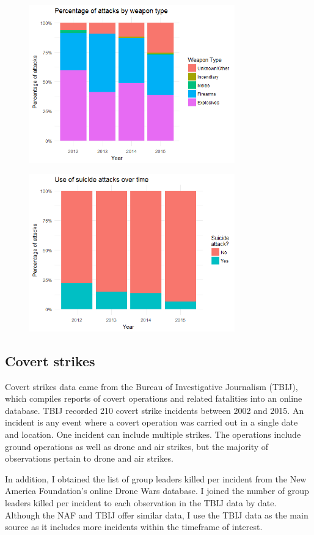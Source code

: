 \documentclass[letterpaper,12pt]{article}
\theoremstyle{definition}
\begin{document}
\begin{figure}[htb!]
  \includegraphics[width=3.5in]{attack_weapon.png}
\end{figure}

\begin{figure}[htb!]
  \includegraphics[width=3.5in]{attack_suicide.png}
\end{figure}

\subsection{Covert strikes}

Covert strikes data came from the Bureau of Investigative Journalism (TBIJ), which compiles reports of covert operations and related fatalities into an online database. TBIJ recorded 210 covert strike incidents between 2002 and 2015. An incident is any event where a covert operation was carried out in a single date and location. One incident can include multiple strikes. The operations include ground operations as well as drone and air strikes, but the majority of observations pertain to drone and air strikes. 

In addition, I obtained the list of group leaders killed per incident from the New America Foundation's online Drone Wars database. I joined the number of group leaders killed per incident to each observation in the TBIJ data by date. Although the NAF and TBIJ offer similar data, I use the TBIJ data as the main source as it includes more incidents within the timeframe of interest.
\end{document}
